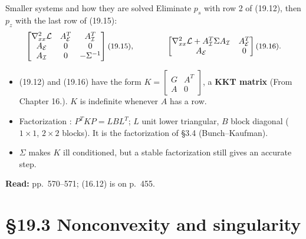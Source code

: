 \documentclass[aspectratio=169,12pt]{beamer}
\newcommand{\eqn}[1]{\text{\small(#1)}}
\newcommand{\readbook}[1]{{\color{red}\textbf{Read:} #1}}
\newcommand{\cE}{\mathcal{E}}
\newcommand{\cI}{\mathcal{I}}
\newcommand{\cL}{\mathcal{L}}
\newcommand{\hessL}{\nabla_{xx}^{2}\cL}
\newcommand{\Ae}{A_{\cE}}
\newcommand{\Ai}{A_{\cI}}
\newcommand{\from}[1]{{\small(From #1.)}}
\begin{document}
\begin{frame}{Smaller systems and how they are solved}
  Eliminate $p_{s}$ with row 2 of (19.12), then $p_{z}$ with the last row of (19.15):
  \[ \begin{bmatrix}
       \hessL & \Ae^{T} & \Ai^{T}\\
       \Ae & 0 & 0\\
       \Ai & 0 & -\Sigma^{-1}
     \end{bmatrix} \eqn{19.15},\qquad\qquad
     \begin{bmatrix}
       \hessL+\Ai^{T}\Sigma\Ai & \Ae^{T}\\
       \Ae & 0
     \end{bmatrix} \eqn{19.16}. \]
  \begin{itemize}\setlength\itemsep{0.15em}
    \item (19.12) and (19.16) have the form $K=\begin{bmatrix} G & A^{T}\\ A & 0\end{bmatrix}$, a
      \textbf{KKT matrix} \from{Chapter 16}. $K$ is indefinite whenever $A$ has a row.
    \item Factorization \eqn{16.12}: $P^{T}KP=LBL^{T}$; $L$ unit lower triangular, $B$ block diagonal
      ($1\times1$, $2\times2$ blocks). It is the factorization of \S3.4 (Bunch--Kaufman).
    \item $\Sigma$ makes $K$ ill conditioned, but a stable factorization still gives an accurate step.
  \end{itemize}
  \readbook{pp.~570--571; (16.12) is on p.~455.}
\end{frame}

\section{\S19.3 Nonconvexity and singularity}
\end{document}
